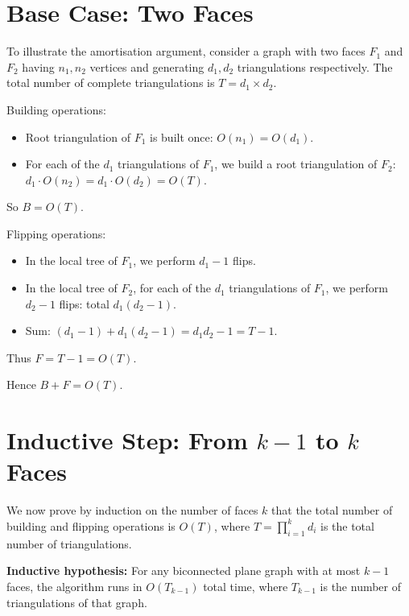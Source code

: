 \section{Base Case: Two Faces}
\label{sec:base_case_two_faces}

To illustrate the amortisation argument, consider a graph with two faces \(F_1\) and \(F_2\) having \(n_1, n_2\) vertices and generating \(d_1, d_2\) triangulations respectively. 
The total number of complete triangulations is \(T = d_1 \times d_2\).

Building operations:
\begin{itemize}
    \item Root triangulation of \(F_1\) is built once: \(O(n_1) = O(d_1)\).
    \item For each of the \(d_1\) triangulations of \(F_1\), we build a root triangulation of \(F_2\): \(d_1 \cdot O(n_2) = d_1 \cdot O(d_2) = O(T)\).
\end{itemize}
So \(B = O(T)\).

Flipping operations:
\begin{itemize}
    \item In the local tree of \(F_1\), we perform \(d_1 - 1\) flips.
    \item In the local tree of \(F_2\), for each of the \(d_1\) triangulations of \(F_1\), we perform \(d_2 - 1\) flips: total \(d_1 (d_2 - 1)\).
    \item Sum: \((d_1 - 1) + d_1(d_2 - 1) = d_1 d_2 - 1 = T - 1\).
\end{itemize}
Thus \(F = T - 1 = O(T)\).

Hence \(B + F = O(T)\).

\section{Inductive Step: From \(k-1\) to \(k\) Faces}
\label{sec:inductive_step}

We now prove by induction on the number of faces \(k\) that the total number of building and flipping operations is \(O(T)\), where \(T = \prod_{i=1}^{k} d_i\) is the total number of triangulations.

\noindent\textbf{Inductive hypothesis:} For any biconnected plane graph with at most \(k-1\) faces, the algorithm runs in \(O(T_{k-1})\) total time, where \(T_{k-1}\) is the number of triangulations of that graph.

